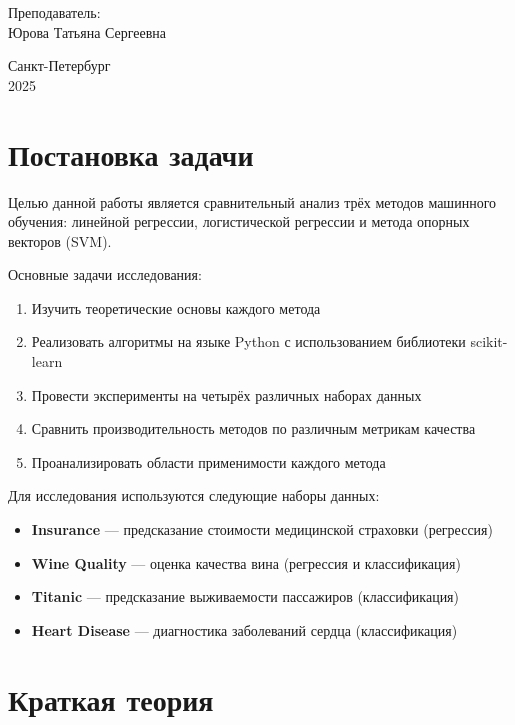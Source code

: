 \documentclass[a4paper]{article}
\begin{document}
\begin{titlepage}
    \vspace{1cm}
    
    \begin{flushleft}
        Преподаватель: \\
        Юрова Татьяна Сергеевна
    \end{flushleft}
    
    \vfill
    
    \centering
    Санкт-Петербург\\
    2025
    
\end{titlepage}

\tableofcontents
\newpage

\section{Постановка задачи}

Целью данной работы является сравнительный анализ трёх методов машинного обучения: линейной регрессии, логистической регрессии и метода опорных векторов (SVM). 

Основные задачи исследования:
\begin{enumerate}
    \item Изучить теоретические основы каждого метода
    \item Реализовать алгоритмы на языке Python с использованием библиотеки scikit-learn
    \item Провести эксперименты на четырёх различных наборах данных
    \item Сравнить производительность методов по различным метрикам качества
    \item Проанализировать области применимости каждого метода
\end{enumerate}

Для исследования используются следующие наборы данных:
\begin{itemize}
    \item \textbf{Insurance} — предсказание стоимости медицинской страховки (регрессия)
    \item \textbf{Wine Quality} — оценка качества вина (регрессия и классификация)
    \item \textbf{Titanic} — предсказание выживаемости пассажиров (классификация)
    \item \textbf{Heart Disease} — диагностика заболеваний сердца (классификация)
\end{itemize}

\section{Краткая теория}
\end{document}
